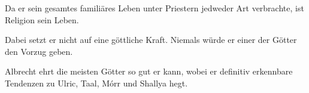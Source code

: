 
Da er sein gesamtes familiäres Leben unter Priestern jedweder Art verbrachte, ist Religion sein Leben.

Dabei setzt er nicht auf eine göttliche Kraft. Niemals würde er einer der Götter den Vorzug geben.

Albrecht ehrt die meisten Götter so gut er kann, wobei er definitiv erkennbare Tendenzen zu Ulric, Taal, Mórr und Shallya hegt.